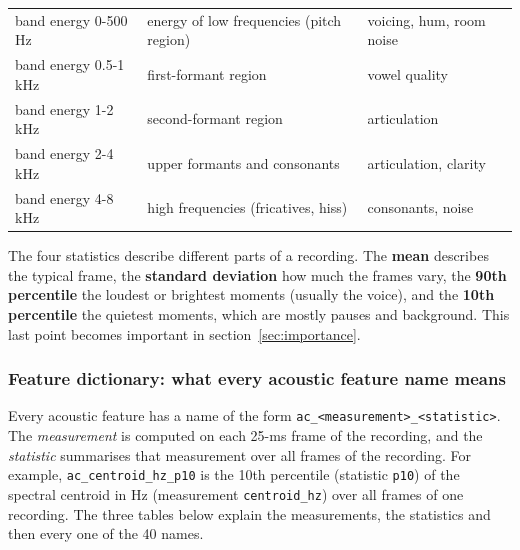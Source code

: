 \documentclass[11pt,a4paper]{article}
\begin{document}
\begin{center}
\begin{longtable}{>{\raggedright\arraybackslash}p{3.32cm}>{\raggedright\arraybackslash}p{5.86cm}>{\raggedright\arraybackslash}p{6.06cm}}
\hspace{0pt}band energy 0-500 Hz & \hspace{0pt}energy of low frequencies (pitch region) & \hspace{0pt}voicing, hum, room noise\\
\hspace{0pt}band energy 0.5-1 kHz & \hspace{0pt}first-formant region & \hspace{0pt}vowel quality\\
\hspace{0pt}band energy 1-2 kHz & \hspace{0pt}second-formant region & \hspace{0pt}articulation\\
\hspace{0pt}band energy 2-4 kHz & \hspace{0pt}upper formants and consonants & \hspace{0pt}articulation, clarity\\
\hspace{0pt}band energy 4-8 kHz & \hspace{0pt}high frequencies (fricatives, hiss) & \hspace{0pt}consonants, noise\\
\end{longtable}\end{center}
\begin{tcolorbox}[colback=green!3,colframe=green!40!black,boxrule=0.5pt,arc=2pt,left=5pt,right=5pt,top=3pt,bottom=3pt,title={\small\bfseries In plain words}]\small The four statistics describe different parts of a recording. The \textbf{mean} describes the typical frame, the \textbf{standard deviation} how much the frames vary, the \textbf{90th percentile} the loudest or brightest moments (usually the voice), and the \textbf{10th percentile} the quietest moments, which are mostly pauses and background. This last point becomes important in section~\ref{sec:importance}.\end{tcolorbox}
\subsubsection{Feature dictionary: what every acoustic feature name means}\label{sec:dictionary}
Every acoustic feature has a name of the form \texttt{ac\_\allowbreak{}<measurement>\_\allowbreak{}<statistic>}. The \emph{measurement} is computed on each 25-ms frame of the recording, and the \emph{statistic} summarises that measurement over all frames of the recording. For example, \texttt{ac\_\allowbreak{}centroid\_\allowbreak{}hz\_\allowbreak{}p10} is the 10th percentile (statistic \texttt{p10}) of the spectral centroid in Hz (measurement \texttt{centroid\_\allowbreak{}hz}) over all frames of one recording. The three tables below explain the measurements, the statistics and then every one of the 40 names.
\end{document}
